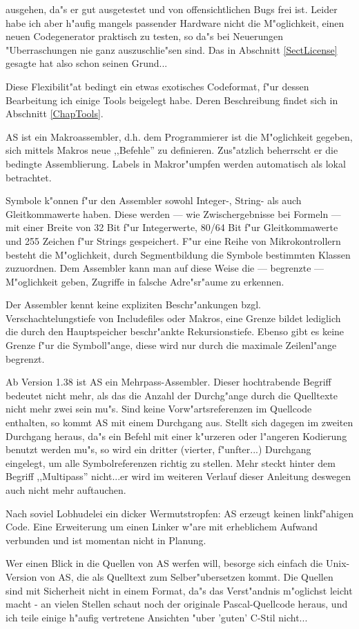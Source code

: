 \documentclass[12pt,a4paper,twoside]{report}
\begin{document}
ausgehen, da"s er gut ausgetestet und von offensichtlichen Bugs frei ist.
Leider habe ich aber h"aufig mangels passender Hardware nicht die
M"oglichkeit, einen neuen Codegenerator praktisch zu testen, so da"s bei
Neuerungen "Uberraschungen nie ganz auszuschlie"sen sind.  Das in
Abschnitt \ref{SectLicense} gesagte hat also schon seinen Grund...
\par
Diese Flexibilit"at bedingt ein etwas exotisches Codeformat, f"ur dessen
Bearbeitung ich einige Tools beigelegt habe.  Deren Beschreibung findet
sich in Abschnitt \ref{ChapTools}.
\par
AS ist ein Makroassembler, d.h. dem Programmierer ist die M"oglichkeit
gegeben, sich mittels Makros neue ,,Befehle'' zu definieren.  Zus"atzlich
beherrscht er die bedingte Assemblierung.  Labels in Makror"umpfen werden
automatisch als lokal betrachtet.
\par
Symbole k"onnen f"ur den Assembler sowohl Integer-, String- als auch
Gleitkommawerte haben.  Diese werden --- wie Zwischergebnisse bei Formeln
--- mit einer Breite von 32 Bit f"ur Integerwerte, 80/64 Bit f"ur
Gleitkommawerte und 255 Zeichen f"ur Strings gespeichert.  F"ur eine Reihe
von Mikrokontrollern besteht die M"oglichkeit, durch Segmentbildung die
Symbole bestimmten Klassen zuzuordnen.  Dem Assembler kann man auf diese
Weise die --- begrenzte --- M"oglichkeit geben, Zugriffe in falsche
Adre"sr"aume zu erkennen.
\par
Der Assembler kennt keine expliziten Beschr"ankungen bzgl.
Verschachtelungstiefe von Includefiles oder Makros, eine Grenze bildet
lediglich die durch den Hauptspeicher beschr"ankte Rekursionstiefe.
Ebenso gibt es keine Grenze f"ur die Symboll"ange, diese wird nur durch
die maximale Zeilenl"ange begrenzt.
\par
Ab Version 1.38 ist AS ein Mehrpass-Assembler.  Dieser hochtrabende Begriff
bedeutet nicht mehr, als das die Anzahl der Durchg"ange durch die Quelltexte
nicht mehr zwei sein mu"s.  Sind keine Vorw"artsreferenzen im Quellcode
enthalten, so kommt AS mit einem Durchgang aus.  Stellt sich dagegen im zweiten
Durchgang heraus, da"s ein Befehl mit einer k"urzeren oder l"angeren Kodierung
benutzt werden mu"s, so wird ein dritter (vierter, f"unfter...) Durchgang
eingelegt, um alle Symbolreferenzen richtig zu stellen.  Mehr steckt hinter dem
Begriff ,,Multipass'' nicht...er wird im weiteren Verlauf dieser Anleitung
deswegen auch nicht mehr auftauchen.
\par
Nach soviel Lobhudelei ein dicker Wermutstropfen: AS erzeugt keinen
linkf"ahigen Code.  Eine Erweiterung um einen Linker w"are mit erheblichem
Aufwand verbunden und ist momentan nicht in Planung.
\par
Wer einen Blick in die Quellen von AS werfen will, besorge sich einfach
die Unix-Version von AS, die als Quelltext zum Selber"ubersetzen kommt.
Die Quellen sind mit Sicherheit nicht in einem Format, da"s das
Verst"andnis m"oglichst leicht macht - an vielen Stellen schaut noch
der originale Pascal-Quellcode heraus, und ich teile einige h"aufig
vertretene Ansichten "uber 'guten' C-Stil nicht...
\end{document}
